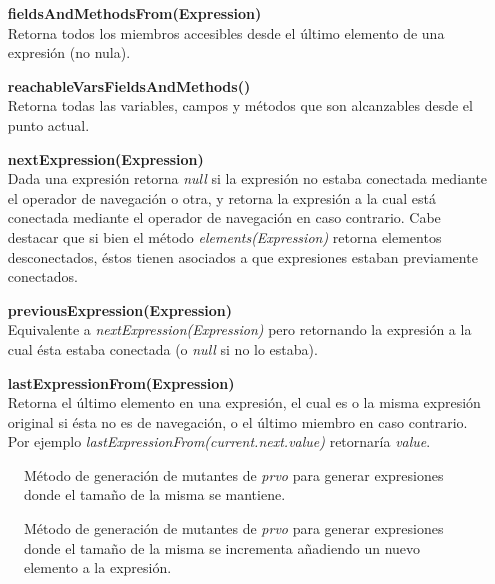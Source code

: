 \begin{enumerate}[leftmargin=.75cm,align=left]
	\item[\textbf{fieldsAndMethodsFrom(Expression)}]\mbox{}\\ Retorna todos los miembros accesibles desde el \'ultimo elemento de una expresi\'on (no nula).
	
	\item[\textbf{reachableVarsFieldsAndMethods()}]\mbox{}\\ Retorna todas las variables, campos y m\'etodos que son alcanzables desde el punto actual.
	
	\item[\textbf{nextExpression(Expression)}]\mbox{}\\ Dada una expresi\'on retorna \emph{null} si la expresi\'on no estaba conectada mediante el operador de navegaci\'on o otra, y retorna la expresi\'on a la cual est\'a conectada mediante el operador de navegaci\'on en caso contrario. Cabe destacar que si bien el m\'etodo \emph{elements(Expression)} retorna elementos desconectados, \'estos tienen asociados a que expresiones estaban previamente conectados.
	
	\item[\textbf{previousExpression(Expression)}]\mbox{}\\ Equivalente a \emph{nextExpression(Expression)} pero retornando la expresi\'on a la cual \'esta estaba conectada (o \emph{null} si no lo estaba).
	
	\item[\textbf{lastExpressionFrom(Expression)}]\mbox{}\\ Retorna el \'ultimo elemento en una expresi\'on, el cual es o la misma expresi\'on original si \'esta no es de navegaci\'on, o el \'ultimo miembro en caso contrario. Por ejemplo \emph{lastExpressionFrom(current.next.value)} retornar\'ia \emph{value}.
\end{enumerate}

\begin{figure}
	
	\caption{M\'etodo de generaci\'on de mutantes de \emph{prvo} para generar expresiones donde el tama\~no de la misma se mantiene.}
	\label{figures.code.prvoMethods.sameLength}
\end{figure}

\begin{figure}
	
	\caption{M\'etodo de generaci\'on de mutantes de \emph{prvo} para generar expresiones donde el tama\~no de la misma se incrementa a\~nadiendo un nuevo elemento a la expresi\'on.}
	\label{figures.code.prvoMethods.increaseLength}
\end{figure}

